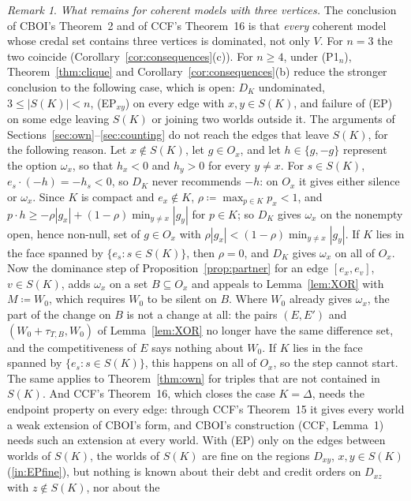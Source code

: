 \documentclass[11pt]{article}
\theoremstyle{definition}\newtheorem{definition}[theorem]{Definition}
\theoremstyle{remark}\newtheorem{remark}[theorem]{Remark}
\begin{document}
\begin{remark}\label{rem:open}
\emph{What remains for coherent models with three vertices.} The conclusion
of CBOI's Theorem~2 and of CCF's Theorem~16 is that \emph{every} coherent
model whose credal set contains three vertices is dominated, not only $V$.
For $n=3$ the two coincide (Corollary~\ref{cor:consequences}(c)). For
$n\ge4$, under (P1$_n$), Theorem~\ref{thm:clique} and
Corollary~\ref{cor:consequences}(b) reduce the stronger conclusion to the
following case, which is open: $D_K$ undominated, $3\le|S(K)|<n$,
(EP$_{xy}$) on every edge with $x,y\in S(K)$, and failure of (EP) on some
edge leaving $S(K)$ or joining two worlds outside it. The arguments of
Sections~\ref{sec:own}--\ref{sec:counting} do not reach the edges that
leave $S(K)$, for the following reason. Let $x\notin S(K)$, let $g\in O_x$,
and let $h\in\{g,-g\}$ represent the option $\omega_x$, so that $h_x<0$ and
$h_y>0$ for every $y\ne x$. For $s\in S(K)$, $e_s\cdot(-h)=-h_s<0$, so
$D_K$ never recommends $-h$: on $O_x$ it gives either silence or
$\omega_x$. Since $K$ is compact and $e_x\notin K$, $\rho\coloneqq
\max_{p\in K}p_x<1$, and $p\cdot h\ge-\rho|g_x|+(1-\rho)\min_{y\ne x}|g_y|$
for $p\in K$; so $D_K$ gives $\omega_x$ on the nonempty open, hence
non-null, set of $g\in O_x$ with $\rho|g_x|<(1-\rho)\min_{y\ne x}|g_y|$. If
$K$ lies in the face spanned by $\{e_s:s\in S(K)\}$, then $\rho=0$, and
$D_K$ gives $\omega_x$ on all of $O_x$. Now the dominance step of
Proposition~\ref{prop:partner} for an edge $[e_x,e_v]$, $v\in S(K)$, adds
$\omega_x$ on a set $B\subseteq O_x$ and appeals to Lemma~\ref{lem:XOR}
with $M\coloneqq W_0$, which requires $W_0$ to be silent on $B$. Where
$W_0$ already gives $\omega_x$, the part of the change on $B$ is not a
change at all: the pairs $(E,E')$ and $(W_0+\tau_{T,B},W_0)$ of
Lemma~\ref{lem:XOR} no longer have the same difference set, and the
competitiveness of $E$ says nothing about $W_0$. If $K$ lies in the face
spanned by $\{e_s:s\in S(K)\}$, this happens on all of $O_x$, so the step
cannot start. The same applies to Theorem~\ref{thm:own} for triples that
are not contained in $S(K)$. And
CCF's Theorem~16, which closes the case $K=\Delta$, needs the endpoint
property on every edge: through CCF's Theorem~15 it gives every world a
weak extension of CBOI's form, and CBOI's construction (CCF, Lemma~1)
needs such an extension at every world. With (EP) only on the edges
between worlds of $S(K)$, the worlds of $S(K)$ are fine on the regions
$D_{xy}$, $x,y\in S(K)$ (\ref{in:EPfine}), but nothing is known about their
debt and credit orders on $D_{xz}$ with $z\notin S(K)$, nor about the

\end{remark}
\end{document}
